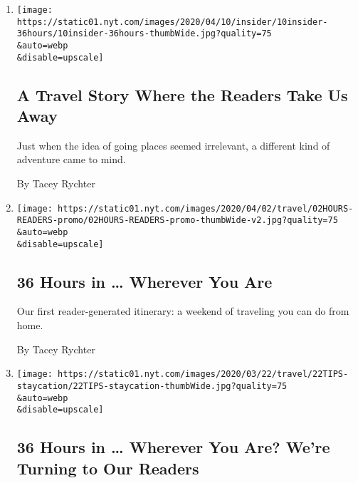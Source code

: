 \begin{enumerate}
\def\labelenumi{\arabic{enumi}.}
\item
  \href{/2020/04/10/reader-center/reporter-travel-36hours.html}{}

  \texttt{[image: https://static01.nyt.com/images/2020/04/10/insider/10insider-36hours/10insider-36hours-thumbWide.jpg?quality=75\\\&auto=webp\\\&disable=upscale]}

  \hypertarget{a-travel-story-where-the-readers-take-us-away}{%
  \subsection{A Travel Story Where the Readers Take Us
  Away}\label{a-travel-story-where-the-readers-take-us-away}}

  Just when the idea of going places seemed irrelevant, a different kind
  of adventure came to mind.

  By Tacey Rychter
\item
  \href{/2020/04/02/travel/36-hours-quarantine.html}{}

  \texttt{[image: https://static01.nyt.com/images/2020/04/02/travel/02HOURS-READERS-promo/02HOURS-READERS-promo-thumbWide-v2.jpg?quality=75\\\&auto=webp\\\&disable=upscale]}

  \hypertarget{36-hours-in--wherever-you-are}{%
  \subsection{36 Hours in \ldots{} Wherever You
  Are}\label{36-hours-in--wherever-you-are}}

  Our first reader-generated itinerary: a weekend of traveling you can
  do from home.

  By Tacey Rychter
\item
  \href{/2020/03/19/travel/36-hours-readers.html}{}

  \texttt{[image: https://static01.nyt.com/images/2020/03/22/travel/22TIPS-staycation/22TIPS-staycation-thumbWide.jpg?quality=75\\\&auto=webp\\\&disable=upscale]}

  \hypertarget{36-hours-in--wherever-you-are-were-turning-to-our-readers}{%
  \subsection{36 Hours in \ldots{} Wherever You Are? We're Turning to
  Our
  Readers}\label{36-hours-in--wherever-you-are-were-turning-to-our-readers}}


\end{enumerate}
